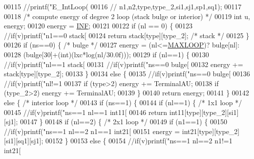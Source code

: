 \begin{DoxyCode}
00115 \textcolor{comment}{//printf("E\_IntLoop(%
00116 \textcolor{comment}{//   n1,n2,type,type\_2,si1,sj1,sp1,sq1);}
00117 
00118   \textcolor{comment}{/* compute energy of degree 2 loop (stack bulge or interior) */}
00119   \textcolor{keywordtype}{int} u, energy;
00120   energy = \mbox{\hyperlink{energy__const_8h_a12c2040f25d8e3a7b9e1c2024c618cb6}{INF}};
00121 
00122   \textcolor{keywordflow}{if} (nl == 0) \{
00123     \textcolor{comment}{//if(v)printf("n1==0 stack[%
00124     \textcolor{keywordflow}{return} stack[type][type\_2];  \textcolor{comment}{/* stack */}
00125   \}
00126   \textcolor{keywordflow}{if} (ns==0) \{                      \textcolor{comment}{/* bulge */}
00127     energy = (nl<=\mbox{\hyperlink{energy__const_8h_ad1bd6eabac419670ddd3c9ed82145988}{MAXLOOP}})? bulge[nl]:
00128       (bulge[30]+(\textcolor{keywordtype}{int})(lxc*log(nl/30.0f)));
00129     \textcolor{keywordflow}{if} (nl==1) \{
00130       \textcolor{comment}{//if(v)printf("nl==1 stack[%
00131       \textcolor{comment}{//if(v)printf("ns==0 bulge[%
00132       energy += stack[type][type\_2];
00133     \}
00134     \textcolor{keywordflow}{else} \{
00135       \textcolor{comment}{//if(v)printf("ns==0 bulge[%
00136       \textcolor{comment}{//if(v)printf("nl!=1 %
00137       \textcolor{keywordflow}{if} (type>2) energy += TerminalAU;
00138       \textcolor{keywordflow}{if} (type\_2>2) energy += TerminalAU;
00139     \}
00140     \textcolor{keywordflow}{return} energy;
00141   \}
00142   \textcolor{keywordflow}{else} \{                            \textcolor{comment}{/* interior loop */}
00143     \textcolor{keywordflow}{if} (ns==1) \{
00144       \textcolor{keywordflow}{if} (nl==1) \{                    \textcolor{comment}{/* 1x1 loop */}
00145   \textcolor{comment}{//if(v)printf("ns==1 nl==1 int11[%
00146         \textcolor{keywordflow}{return} int11[type][type\_2][si1][sj1];
00147       \}
00148       \textcolor{keywordflow}{if} (nl==2) \{                  \textcolor{comment}{/* 2x1 loop */}
00149         \textcolor{keywordflow}{if} (n1==1) \{
00150     \textcolor{comment}{//if(v)printf("ns==1 nl==2 n1==1 int21[%
00151           energy = int21[type][type\_2][si1][sq1][sj1];
00152   \}
00153   \textcolor{keywordflow}{else} \{
00154     \textcolor{comment}{//if(v)printf("ns==1 nl==2 n1!=1 int21[%
}}}}}}}}}
\end{DoxyCode}
